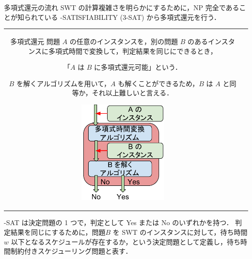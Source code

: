 \documentclass[dvipdfmx]{beamer}
\begin{document}
    \begin{frame}{多項式還元の流れ}
      SWT の計算複雑さを明らかにするために，NP 完全であることが知られている {-SATISFIABILITY (3-SAT)} から\alert{多項式還元}を行う．
      \begin{tabular}{cc}
        \begin{minipage}[]{0.6\hsize}
          \begin{block}{多項式還元}
            問題 $A$ の任意のインスタンスを，別の問題 $B$ のあるインスタンスに多項式時間で変換して，判定結果を同じにできるとき，
            \begin{center}
              「$A$ は $B$ に多項式還元可能」という．
            \end{center}
            $B$ を解くアルゴリズムを用いて，$A$ も解くことができるため，$B$ は $A$ と同等か，それ以上難しいと言える．
          \end{block}
        \end{minipage}
        \begin{minipage}[]{0.4\hsize}
          \begin{figure}[h]
            \centering
            \includegraphics[width=4.5cm]{figure/reduction.pdf}
          \end{figure}
        \end{minipage}
        \vspace{5mm}
      \end{tabular}
      \vspace{-7mm}
      \begin{block}{}
        {-SAT} は決定問題の 1 つで，判定として Yes または No のいずれかを持つ．
        判定結果を同じにするために，問題$B$ を SWT のインスタンスに対して，待ち時間 $w$ 以下となるスケジュールが存在するか，という決定問題として定義し，\alert{待ち時間制約付きスケジューリング問題}と表す．
      \end{block}
    \end{frame}
\end{document}
